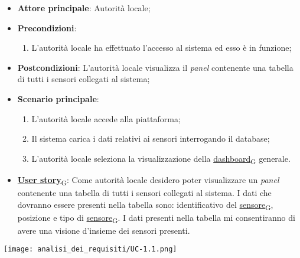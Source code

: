 \begin{itemize}
	\item \textbf{Attore principale}: Autorità locale;
	\item \textbf{Precondizioni}:
	      \begin{enumerate}
		      \item L'autorità locale ha effettuato l'accesso al sistema ed esso è in funzione;
	      \end{enumerate}
	\item \textbf{Postcondizioni}:
	      L'autorità locale visualizza il \textit{panel} contenente una tabella di tutti i sensori collegati al sistema;

	\item \textbf{Scenario principale}:
	      \begin{enumerate}
		      \item L'autorità locale accede alla piattaforma;
		      \item Il sistema carica i dati relativi ai sensori interrogando il database;
		      \item L'autorità locale seleziona la visualizzazione della \href{https://7last.github.io/docs/rtb/documentazione-interna/glossario\#dashboard}{dashboard\textsubscript{G}} generale.
	      \end{enumerate}
	\item \href{https://7last.github.io/docs/rtb/documentazione-interna/glossario\#user-story}{\textbf{User story}\textsubscript{G}}: Come autorità locale desidero poter visualizzare un \textit{panel} contenente una tabella di tutti i sensori collegati al sistema.
	      I dati che dovranno essere presenti nella tabella sono: identificativo del \href{https://7last.github.io/docs/rtb/documentazione-interna/glossario\#sensore}{sensore\textsubscript{G}}, posizione e tipo di \href{https://7last.github.io/docs/rtb/documentazione-interna/glossario\#sensore}{sensore\textsubscript{G}}.
	      I dati presenti nella tabella mi consentiranno di avere una visione d'insieme dei sensori presenti.

\end{itemize}
\begin{center}
	\texttt{[image: analisi\_dei\_requisiti/UC-1.1.png]}
\end{center}

